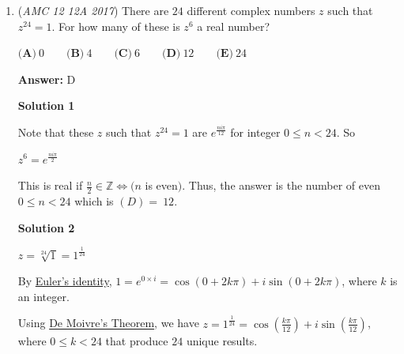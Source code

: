 \begin{enumerate}
\textbf{Solution 6 (Kissing Circles)}

Draw the other half of the largest circle and proceed with \href{https://artofproblemsolving.com/wiki/index.php?title=Descartes\%27\_Circle\_Formula}{Descartes' Circle Formula}.

 The curvatures of circles $A,B,C$, and $P$ are $\frac{1}{2}, 1, -\frac{1}{3},$ and $\frac{1}{r}$, respectively.

 Using the formula derived: 
 \[k_4 = k_1 + k_2 + k_3 \pm 2\sqrt{k_1k_2 + k_2k_3 + k_3k_1}.\]

 Plug in values to get:$\frac{1}{2}+1-\frac{1}{3}-\sqrt{\frac{1}{2}-\frac{1}{6}-\frac{1}{3}}$. Notice how the stuff inside the square root cancel to 0. Therefore the answer is just $\frac{1}{2}+1-\frac{1}{3}=\frac{6}{7}\rightarrow \boxed{B}.$



	\item (\textit{AMC 12 12A 2017}) There are $24$ different complex numbers $z$ such that $z^{24}=1$. For how many of these is $z^6$ a real number?


 $\textbf{(A)}\ 0 \qquad\textbf{(B)}\ 4 \qquad\textbf{(C)}\ 6 \qquad\textbf{(D)}\ 12 \qquad\textbf{(E)}\ 24$

 \textbf{Answer: }D



\textbf{Solution 1}

Note that these $z$ such that $z^{24}=1$ are $e^{\frac{ni\pi}{12}}$ for integer $0\leq n<24$. So

 $z^6=e^{\frac{ni\pi}{2}}$

 This is real if $\frac{n}{2}\in \mathbb{Z} \Leftrightarrow (n$ is even$)$. Thus, the answer is the number of even $0\leq n<24$ which is $\boxed{(D)=\ 12}$.

 



\textbf{Solution 2}

$z = \sqrt[24]{1} = 1^{\frac{1}{24}}$

 By \href{https://artofproblemsolving.com/wiki/index.php?title=Euler\%27s\_identity}{Euler's identity}, $1 = e^{0 \times i} = \cos (0+2k\pi) + i \sin(0+2k\pi)$, where $k$ is an integer.

 Using \href{https://artofproblemsolving.com/wiki/index.php?title=De\_Moivre\%27s\_Theorem}{De Moivre's Theorem}, we have $z = 1^{\frac{1}{24}} = {\cos (\frac{k\pi}{12}) + i \sin (\frac{k\pi}{12})}$, where $0 \leq k<24$ that produce $24$ unique results.


\end{enumerate}
